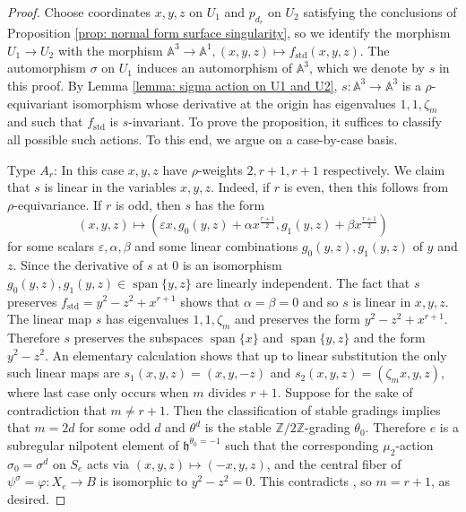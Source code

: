\documentclass{article} %
\numberwithin{equation}{section}
\theoremstyle{definition}
\newcommand{\A}{\mathbb{A}}
\newcommand{\Z}{\mathbb{Z}}
\newcommand{\frakh}{\mathfrak h}
\newcommand{\al}{\alpha}
\newcommand{\be}{\beta}
\DeclareMathOperator{\spn}{span}
\newcommand{\rl}{r} %
\begin{document}
\begin{proof}
    Choose coordinates $x,y,z$ on $U_1$ and $p_{d_r}$ on $U_2$ satisfying the conclusions of Proposition \ref{prop: normal form surface singularity}, so we identify the morphism $U_1\rightarrow U_2$ with the morphism $\A^3\rightarrow \A^1, (x,y,z)\mapsto f_{\mathrm{std}}(x,y,z)$. 
    The automorphism $\sigma$ on $U_1$ induces an automorphism of $\A^3$, which we denote by $s$ in this proof.
    By Lemma \ref{lemma: sigma action on U1 and U2}, $s \colon \A^3\rightarrow \A^3$ is a $\rho$-equivariant isomorphism whose derivative at the origin has eigenvalues $1,1,\zeta_m$ and such that $f_{\mathrm{std}}$ is $s$-invariant.
    To prove the proposition, it suffices to classify all possible such actions.
    To this end, we argue on a case-by-case basis.

     Type $A_\rl$:  In this case $x, y, z$ have $\rho$-weights $2, \rl + 1, \rl + 1$ respectively. 
     We claim that $s$ is linear in the variables $x,y,z$. Indeed, if $r$ is even, then this follows from $\rho$-equivariance. If $r$ is odd, then $s$ has the form 
     \begin{equation*}
     (x,y,z)\mapsto (\varepsilon x, g_0(y,z) + \al x^{\frac{r + 1}{2}}, g_1(y,z) + \be x^{\frac{r + 1}{2}})
    \end{equation*}
    for some scalars $\varepsilon, \al, \be$ and some linear combinations $g_0(y,z),g_1(y,z)$ of $y$ and $z$.
    Since the derivative of $s$ at $0$ is an isomorphism $g_0(y,z), g_1(y,z)\in \spn\{y,z\}$ are linearly independent.
    The fact that $s$ preserves $f_{\mathrm{std}} = y^2-z^2 + x^{\rl+1}$ shows that $\al = \be=0$ and so $s$ is linear in $x,y,z$.
    The linear map $s$ has eigenvalues $1,1,\zeta_m$ and preserves the form $y^2-z^2 + x^{\rl+1}$.
    Therefore $s$ preserves the subspaces $\spn\{x\}$ and $\spn\{y,z\}$ and the form $y^2 - z^2$.
    An elementary calculation shows that up to linear substitution the only such linear maps are $s_1(x,y,z)=(x,y,-z)$ and $s_2(x,y,z)=(\zeta_mx,y,z)$, where last case only occurs when $m$ divides $\rl+1$.
    Suppose for the sake of contradiction that $m\neq \rl+1$.
    Then the classification of stable gradings \cite[Section 7.2]{GrossLevyReederYu-GradingsPosRank} implies that $m = 2d$ for some odd $d$ and $\theta^d$ is the stable $\Z/2\Z$-grading $\theta_0$.
    Therefore $e$ is a subregular nilpotent element of $\frakh^{\theta_0=-1}$ such that the corresponding $\mu_2$-action $\sigma_0=\sigma^{d}$ on $S_e$ acts via $(x,y,z)\mapsto (-x,y,z)$, and the central fiber of $\psi^{\sigma} = \varphi\colon X_e\rightarrow B$ is isomorphic to $y^2 - z^2 = 0$.
    This contradicts \cite[Proposition 3.11]{Thorne-thesis}, so $m=\rl+1$, as desired. 
    

\end{proof}
\end{document}
